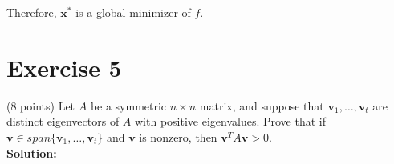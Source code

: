 \documentclass{article}
\begin{document}
Therefore, $\mathbf{x}^*$ is a global minimizer of $f$. \\

\newpage

\section*{Exercise 5}
(8 points) Let $A$ be a symmetric $n \times n$ matrix, and suppose that $\mathbf{v}_1,\ldots,\mathbf{v}_t$ are distinct eigenvectors of $A$ with positive eigenvalues. Prove that if $\mathbf{v} \in span\{\mathbf{v}_1,\ldots,\mathbf{v}_t\}$ and $\mathbf{v}$ is nonzero, then $\mathbf{v}^T A\mathbf{v} > 0$. \\

\textbf{Solution:}

\newpage
\end{document}

